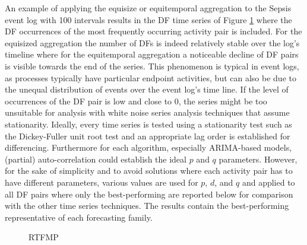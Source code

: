 An example of applying the equisize or equitemporal aggregation to the Sepsis event log with 100 intervals results in the DF time series of Figure \ref{fig:sepsists} where the DF occurrences of the most frequently occurring activity pair is included.
For the equisized aggregation the number of DFs is indeed relatively stable over the log's timeline where for the equitemporal aggregation a noticeable decline of DF pairs is visible towards the end of the series.
This phenomenon is typical in event logs, as processes typically have particular endpoint activities, but can also be due to the unequal distribution of events over the event log's time line.
If the level of occurrences of the DF pair is low and close to 0, the series might be too unsuitable for analysis with white noise series analysis techniques that assume stationarity.
Ideally, every time series is tested using a stationarity test such as the Dickey-Fuller unit root test \cite{leybourne1995testing} and an appropriate lag order is established for differencing. 
Furthermore for each algorithm, especially ARIMA-based models, (partial) auto-correlation could establish the ideal $p$ and $q$ parameters.
However, for the sake of simplicity and to avoid solutions where each activity pair has to have different parameters, various values are used for $p$, $d$, and $q$ and applied to all DF pairs where only the best-performing are reported below for comparison with the other time series techniques.
The results contain the best-performing representative of each forecasting family.
\begin{figure}[tb]
	\centering
	\caption{RTFMP}
	\label{fig:sepsists}
\end{figure}

